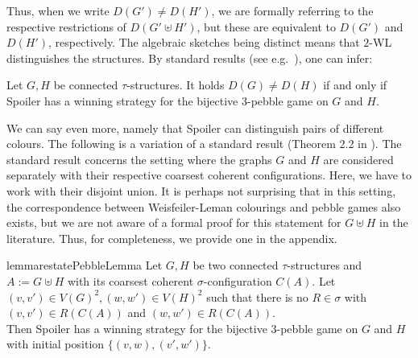 \documentclass[a4paper,UKenglish,cleveref, autoref, thm-restate]{lipics-v2021}
\begin{document}
	Thus, when we write $D(G') \neq D(H')$, we are formally referring to the respective restrictions of $D(G' \uplus H')$, but these are equivalent to $D(G')$ and $D(H')$, respectively.
	The algebraic sketches being distinct means that $2$-WL distinguishes the structures. By standard results (see e.g.\ \cite{sandraSiglog}), one can infer:
	\begin{lemma}
		\label{lem:sketchesDistinctSpoilerWins}
		Let $G, H$ be connected $\tau$-structures. It holds $D(G) \neq D(H)$ if and only if Spoiler has a winning strategy for the bijective $3$-pebble game on $G$ and $H$. 
	\end{lemma}	
	
	We can say even more, namely that Spoiler can distinguish pairs of different colours. The following is a variation of a standard result (Theorem 2.2 in \cite{sandraSiglog}). The standard result concerns the setting where the graphs $G$ and $H$ are considered separately with their respective coarsest coherent configurations. Here, we have to work with their disjoint union. It is perhaps not surprising that in this setting, the correspondence between Weisfeiler-Leman colourings and pebble games also exists, but we are not aware of a formal proof for this statement for $G \uplus H$ in the literature. Thus, for completeness, we provide one in the appendix.
	\begin{restatable}{lemma}{restatePebbleLemma}
		\label{lem:PC_equivWLPebble}
		Let $G,H$ be two connected $\tau$-structures and $A := G \uplus H$ with its coarsest coherent $\sigma$-configuration $C(A)$. Let $(v,v') \in V(G)^2, (w,w') \in V(H)^2$ such that there is no $R \in \sigma$ with $(v,v') \in R(C(A))$ and $(w,w') \in R(C(A))$.\\
		Then Spoiler has a winning strategy for the bijective 3-pebble game on $G$ and $H$ with initial position $\{(v,w),(v',w')\}$.
	\end{restatable}
	
\end{document}

